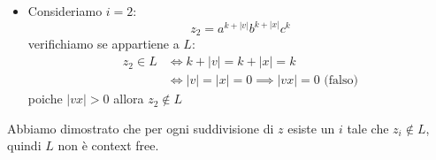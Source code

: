\documentclass[a4paper]{article}
\begin{document}
\begin{example}
\begin{enumerate}
      \begin{itemize}
        \item Consideriamo \( i = 2 \):
          \[
            z_2 = a^{k + \left| v \right|} b^{k + \left| x \right|} c^k
          \] 
          verifichiamo se appartiene a \( L \):
          \[
            \begin{aligned}
              z_2 \in L &\iff k + \left| v \right| = k + \left| x \right| = k\\
                        &\iff \left| v \right| = \left| x \right| = 0 \implies \left| vx \right| = 0
              \text{ (falso)}
            \end{aligned}
          \]
          poiche \( \left| vx \right| > 0 \) allora \( z_2 \notin L \)
      \end{itemize}
  \end{enumerate}
  Abbiamo dimostrato che per ogni suddivisione di \( z \) esiste un \( i \)
  tale che \( z_i \notin L \), quindi \( L \) non è context free.
\end{example}
\end{document}
